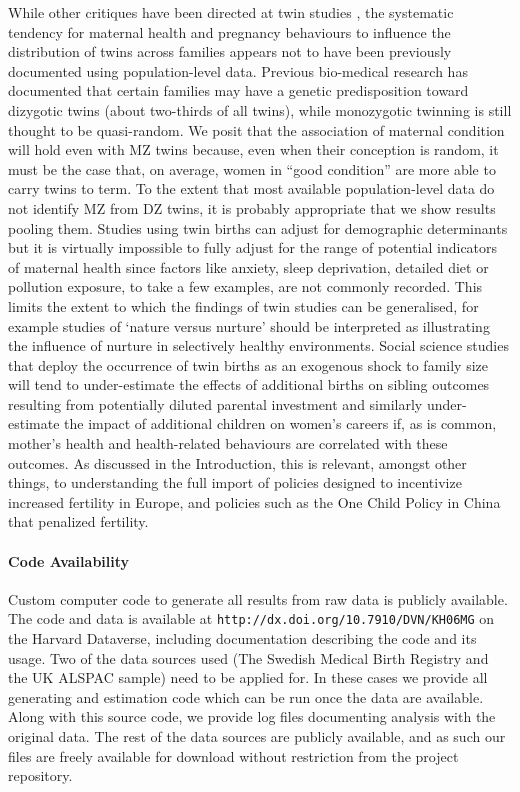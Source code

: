 \documentclass[11pt]{article}
\begin{document}
While other critiques have been directed at twin studies \cite{RosenzweigZhang2009}, the systematic tendency for maternal health and pregnancy behaviours to influence the distribution of twins across families appears not to have been previously documented using population-level data. Previous bio-medical research has documented that certain families may have a genetic predisposition toward dizygotic twins (about two-thirds of all twins), while monozygotic twinning is still thought to be quasi-random. We posit that the association of maternal condition will hold even with MZ twins because, even when their conception is random, it must be the case that, on average, women in ``good condition'' are more able to carry twins to term. To the extent that most available population-level data do not identify MZ from DZ twins, it is probably appropriate that we show results pooling them.  Studies using twin births can adjust for demographic determinants but it is virtually impossible to fully adjust for the range of potential indicators of maternal health since factors like anxiety, sleep deprivation, detailed diet or pollution exposure, to take a few examples, are not commonly recorded. This limits the extent to which the findings of twin studies can be generalised, for example studies of `nature versus nurture' should be interpreted as illustrating the influence of nurture in selectively healthy environments. Social science studies that deploy the occurrence of twin births as an exogenous shock to family size will tend to under-estimate the effects of additional births on sibling outcomes resulting from potentially diluted parental investment and similarly under-estimate the impact of additional children on women's careers if, as is common, mother's health and health-related behaviours are correlated with these outcomes. As discussed in the Introduction, this is relevant, amongst other things, to understanding the full import of policies designed to incentivize increased fertility in Europe, and policies such as the One Child Policy in China that penalized fertility.






\paragraph{Code Availability}
Custom computer code to generate all results from raw data is publicly available. The code and data is available at \texttt{http://dx.doi.org/10.7910/DVN/KH06MG} on the Harvard Dataverse, including documentation describing the code and its usage. Two of the data sources used (The Swedish Medical Birth Registry and the UK ALSPAC sample) need to be applied for. In these cases we provide all generating and estimation code which can be run once the data are available. Along with this source code, we provide log files documenting analysis with the original data.  The rest of the data sources are publicly available, and as such our files are freely available for download without restriction from the project repository.
\end{document}
